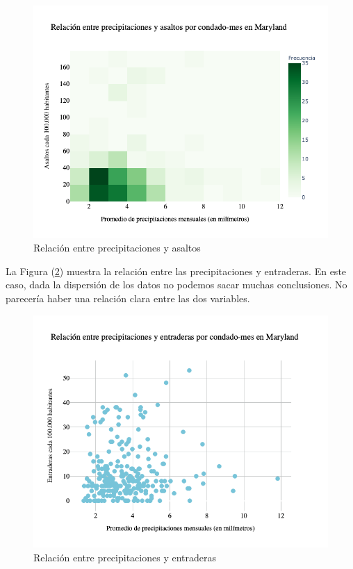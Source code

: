 \documentclass[12pt]{article}
\begin{document}
\begin{figure}[htbp]
    \centering
    \includegraphics[width = \textwidth]{graficos/Precip_Assault_H2D.png}
    \caption{Relaci\'on entre precipitaciones y asaltos}
    \label{asaltosprecip}
\end{figure}

La Figura (\ref{breakprecip}) muestra la relaci\'on entre las precipitaciones y entraderas. En este caso, dada la dispersi\'on de los datos no podemos sacar muchas conclusiones. No parecer\'ia haber una relaci\'on clara entre las dos variables.
\begin{figure}[htbp]
    \centering
    \includegraphics[width = \textwidth]{graficos/Precip_Breakings.png}
    \caption{Relaci\'on entre precipitaciones y entraderas}
    \label{breakprecip}
\end{figure}
\end{document}
